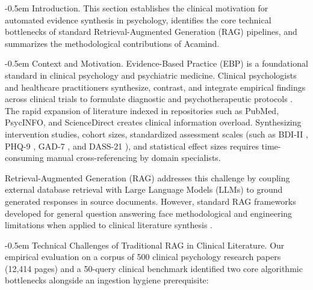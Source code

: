 \documentclass[10pt]{SPIIRAS_Proceedings}
\makeatletter
\renewcommand\section{\@startsection{section}{1}{\parindent}%
  {\z@}%
  {-0.5em}%
  {\normalfont\normalsize\bfseries}}
\renewcommand\subsection{\@startsection{subsection}{2}{\parindent}%
  {\z@}%
  {-0.5em}%
  {\normalfont\normalsize\bfseries}}
\makeatother
\begin{document}

\makeengtitle

\normalsize
\raggedbottom

\section{Introduction.} This section establishes the clinical motivation for automated evidence synthesis in psychology, identifies the core technical bottlenecks of standard Retrieval-Augmented Generation (RAG) pipelines, and summarizes the methodological contributions of Acamind.

\subsection{Context and Motivation.} Evidence-Based Practice (EBP) \cite{sackett1996evidence} is a foundational standard in clinical psychology and psychiatric medicine. Clinical psychologists and healthcare practitioners synthesize, contrast, and integrate empirical findings across clinical trials to formulate diagnostic and psychotherapeutic protocols \cite{moher2009preferred}. The rapid expansion of literature indexed in repositories such as PubMed, PsycINFO, and ScienceDirect creates clinical information overload. Synthesizing intervention studies, cohort sizes, standardized assessment scales (such as BDI-II \cite{beck1996manual}, PHQ-9 \cite{kroenke2001phq}, GAD-7 \cite{spitzer2006brief}, and DASS-21 \cite{lovibond1995structure}), and statistical effect sizes \cite{cohen1988statistical} requires time-consuming manual cross-referencing by domain specialists.

Retrieval-Augmented Generation (RAG) \cite{lewis2020retrieval} addresses this challenge by coupling external database retrieval with Large Language Models (LLMs) to ground generated responses in source documents. However, standard RAG frameworks developed for general question answering face methodological and engineering limitations when applied to clinical literature synthesis \cite{gao2024modular}.

\subsection{Technical Challenges of Traditional RAG in Clinical Literature.} Our empirical evaluation on a corpus of 500 clinical psychology research papers (12,414 pages) and a 50-query clinical benchmark identified two core algorithmic bottlenecks alongside an ingestion hygiene prerequisite:
\end{document}
